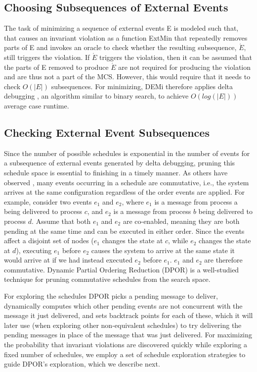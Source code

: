 \subsection{Choosing Subsequences of External Events}
The task of minimizing a sequence of external events E is modeled such that, that causes an invariant violation as a function ExtMin that repeatedly removes parts of E and invokes an oracle to check whether the resulting subsequence, $\acute{E}$, still triggers the violation. If $\acute{E}$ triggers the violation, then it can be assumed that the parts of E removed to produce $\acute{E}$ are not required for producing the violation and are thus not a part of the MCS. However, this would require that it needs to check $O(|E|)$ subsequences. For minimizing, DEMi therefore applies delta debugging \cite{6}, an algorithm similar to binary search, to achieve $O(log(|E|))$ average case runtime.

\subsection{Checking External Event Subsequences}
Since the number of possible schedules is exponential in the number of events for a subsequence of external events generated by delta debugging, pruning this schedule space is essential to finishing in a timely manner. As others have observed \cite{7}, many events occurring in a schedule are commutative, i.e., the system arrives at the same configuration regardless of the order events are applied. For example, consider two events $e_1$ and $e_2$, where $e_1$ is a message from process a being delivered to process $c$, and $e_2$ is a message from process $b$ being
delivered to process $d$. Assume that both $e_1$ and $e_2$ are co-enabled, meaning they are both pending at the same
time and can be executed in either order. Since the events affect a disjoint set of nodes ($e_1$ changes the state at $c$, while $e_2$ changes the state at $d$), executing $e_1$ before $e_2$ causes the system to arrive at the same state it would arrive at if we had instead executed $e_2$ before $e_1$. $e_1$ and $e_2$ are therefore commutative. Dynamic Partial Ordering Reduction (DPOR)\cite{8} is a well-studied technique for pruning commutative schedules from the search space.

For exploring the schedules DPOR  picks a pending message to deliver, dynamically computes which other pending events are not concurrent with the message it just delivered, and sets backtrack points for each of these, which it will later use (when exploring other non-equivalent schedules) to try delivering the pending messages in place of the message that was just delivered. For maximizing the probability that invariant violations are discovered
quickly while exploring a fixed number of schedules, we employ a set of schedule exploration strategies to guide
DPOR’s exploration, which we describe next.


